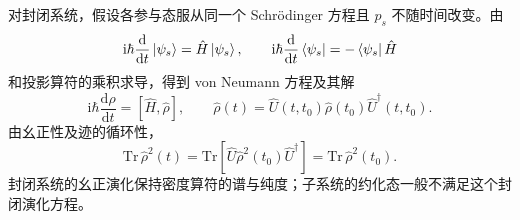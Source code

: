 对封闭系统，假设各参与态服从同一个 Schr\"odinger 方程且 $p_s$ 不随时间改变。由
\begin{equation}
\mathrm{i}\hbar\frac{\mathrm{d}}{\mathrm{d}t}\Ket{\psi_s}=\hat H\Ket{\psi_s},\qquad
\mathrm{i}\hbar\frac{\mathrm{d}}{\mathrm{d}t}\Bra{\psi_s}=-\Bra{\psi_s}\hat H
\end{equation}
和投影算符的乘积求导，得到 von Neumann 方程及其解
\begin{equation}
\boxed{\mathrm{i}\hbar\frac{\mathrm{d}\hat\rho}{\mathrm{d}t}=\left[\hat H,\hat\rho\right],}
\qquad
\hat\rho\left(t\right)=\hat U\left(t,t_0\right)\hat\rho\left(t_0\right)\hat U^\dagger\left(t,t_0\right).
\end{equation}
由幺正性及迹的循环性，
\begin{equation}
\mathrm{Tr}\,\hat\rho^2\left(t\right)
=\mathrm{Tr}\left[\hat U\hat\rho^2\left(t_0\right)\hat U^\dagger\right]
=\mathrm{Tr}\,\hat\rho^2\left(t_0\right).
\end{equation}
封闭系统的幺正演化保持密度算符的谱与纯度；子系统的约化态一般不满足这个封闭演化方程。

